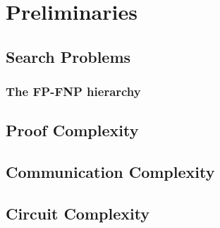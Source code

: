 \hypersetup{colorlinks=true, linkcolor=blue, citecolor=red}

\chapter{Preliminaries} \label{chap:preliminaries}

\section{Search Problems}






\subsection{The FP-FNP hierarchy}

\section{Proof Complexity}

\section{Communication Complexity}

\section{Circuit Complexity}

\cleardoublepage